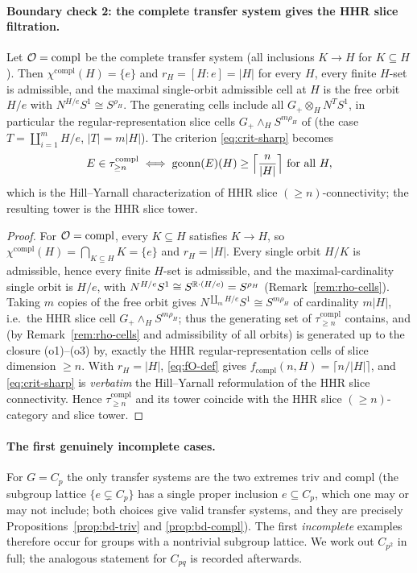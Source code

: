 \paragraph{Boundary check 2: the complete transfer system gives the HHR slice filtration.}

\begin{qfiveproposition}[complete $\qfiveaO$ $=$ HHR slice]\label{prop:bd-compl}
Let $\mathcal{O}=\mathrm{compl}$ be the complete transfer system (all inclusions
$K\to H$ for $K\subseteq H$). Then $\chi^{\mathrm{compl}}(H)=\{e\}$ and
$r_H=[H:e]=|H|$ for every $H$, every finite $H$-set is admissible, and the
maximal single-orbit admissible cell at $H$ is the free orbit $H/e$ with
$N^{H/e}S^1\cong S^{\rho_H}$. The generating cells include all
$G_+\otimes_H N^{T}S^1$, in particular the regular-representation slice cells
$G_+\wedge_H S^{m\rho_H}$ of \cite{HHR16} (the case $T=\coprod_{i=1}^{m}H/e$,
$|T|=m|H|$). The criterion \eqref{eq:crit-sharp} becomes
\[
E\in\tau^{\mathrm{compl}}_{\ge n}\iff
\operatorname{gconn}(E)(H)\ge\Bigl\lceil\frac{n}{|H|}\Bigr\rceil\ \text{for all }H,
\]
which is the Hill--Yarnall characterization \cite{HY18} of HHR slice
$(\ge n)$-connectivity; the resulting tower is the HHR slice tower.
\end{qfiveproposition}

\begin{proof}
For $\mathcal{O}=\mathrm{compl}$, every $K\subseteq H$ satisfies $K\to H$, so
$\chi^{\mathrm{compl}}(H)=\bigcap_{K\subseteq H}K=\{e\}$ and $r_H=|H|$. Every
single orbit $H/K$ is admissible, hence every finite $H$-set is admissible, and
the maximal-cardinality single orbit is $H/e$, with $N^{H/e}S^1\cong
S^{\mathbb{R}\cdot(H/e)}=S^{\rho_H}$ (Remark~\ref{rem:rho-cells}). Taking $m$ copies of
the free orbit gives $N^{\coprod_m H/e}S^1\cong S^{m\rho_H}$ of cardinality
$m|H|$, i.e.\ the HHR slice cell $G_+\wedge_H S^{m\rho_H}$; thus the generating
set of $\tau^{\mathrm{compl}}_{\ge n}$ contains, and (by
Remark~\ref{rem:rho-cells} and admissibility of all orbits) is generated up to
the closure (o1)--(o3) by, exactly the HHR regular-representation cells of
slice dimension $\ge n$. With $r_H=|H|$, \eqref{eq:fO-def} gives
$f_{\mathrm{compl}}(n,H)=\lceil n/|H|\rceil$, and \eqref{eq:crit-sharp} is
\emph{verbatim} the Hill--Yarnall reformulation \cite{HY18} of the HHR slice
connectivity. Hence $\tau^{\mathrm{compl}}_{\ge n}$ and its tower coincide with
the HHR slice $(\ge n)$-category and slice tower.
\end{proof}

\paragraph{The first genuinely incomplete cases.}
For $G=C_p$ the only transfer systems are the two extremes $\mathrm{triv}$ and
$\mathrm{compl}$ (the subgroup lattice $\{e\subsetneq C_p\}$ has a single proper
inclusion $e\subseteq C_p$, which one may or may not include; both choices give
valid transfer systems, and they are precisely Propositions~\ref{prop:bd-triv}
and \ref{prop:bd-compl}). The first \emph{incomplete} examples therefore occur
for groups with a nontrivial subgroup lattice. We work out $C_{p^2}$ in full;
the analogous statement for $C_{pq}$ is recorded afterwards.

